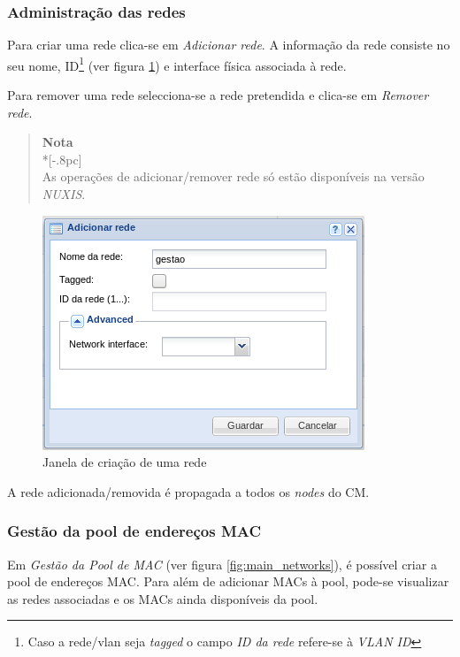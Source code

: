 \subsubsection{Administração das redes}

Para criar uma rede clica-se em \emph{Adicionar rede}.
A informação da rede consiste no seu nome, ID\footnote{Caso a rede/vlan seja \emph{tagged} o campo \emph{ID da rede} refere-se à \emph{VLAN ID}} (ver figura \ref{fig:network_create}) e interface física associada à rede.

Para remover uma rede selecciona-se a rede pretendida e clica-se em \emph{Remover rede}.

\begin{quote}
	{\large \bf Nota} \\*[-.8pc]
	\underline{\hspace{6in}} \\
	As operações de adicionar/remover rede só estão disponíveis na versão \emph{NUXIS}.
\end{quote}


\begin{figure}[H]
	\begin{center}
	\includegraphics[scale=0.5]{screenshots/network_create.png}
	\caption{Janela de criação de uma rede}
	\label{fig:network_create}
	\end{center}
\end{figure}

A rede adicionada/removida é propagada a todos os \emph{nodes} do CM.


\subsubsection{Gestão da pool de endereços MAC}
\label{sec:mac_pool}

Em \emph{Gestão da Pool de MAC} (ver figura \ref{fig:main_networks}), é possível criar a pool de endereços MAC.
Para além de adicionar MACs à pool, pode-se visualizar as redes associadas e os MACs ainda disponíveis da pool.

